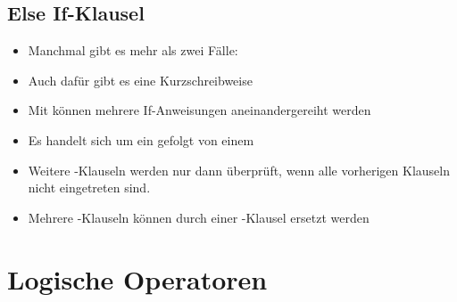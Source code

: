 \subsection{Else If-Klausel}

\begin{frame}
    \slidehead
    \begin{itemize}
        \item Manchmal gibt es mehr als zwei Fälle:
        \item Auch dafür gibt es eine Kurzschreibweise
    \end{itemize}
\end{frame}

\begin{frame}
    \slidehead

    \begin{itemize}
        \item Mit  können mehrere If-Anweisungen aneinandergereiht werden
        \item Es handelt sich um ein  gefolgt von einem 
        \item Weitere -Klauseln werden nur dann überprüft, wenn alle vorherigen Klauseln nicht eingetreten sind.
    \end{itemize}
\end{frame}

\livecoding

\begin{frame}
    \slidehead
    \begin{itemize}
        \item Mehrere -Klauseln können durch einer -Klausel ersetzt werden
    \end{itemize}
\end{frame}

\livecoding


\section{Logische Operatoren}

